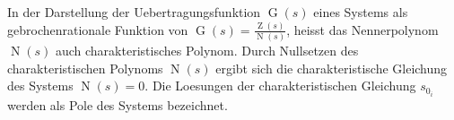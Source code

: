 In der Darstellung der Uebertragungsfunktion $\operatorname{G}(s)$ eines Systems als gebrochenrationale Funktion von $\operatorname{G}(s) = \frac{\operatorname{Z}(s)}{\operatorname{N}(s)}$, heisst das Nennerpolynom $\operatorname{N}(s)$ auch charakteristisches Polynom. Durch Nullsetzen des charakteristischen Polynoms $\operatorname{N}(s)$ ergibt sich die charakteristische Gleichung des Systems $\operatorname{N}(s) = 0$.  Die Loesungen der charakteristischen Gleichung $s_{0_i}$ werden als Pole des Systems bezeichnet.
